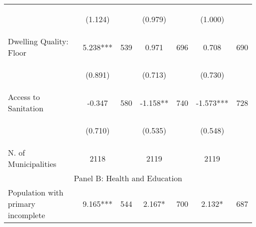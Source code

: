 \begin{tabular}{lcccccc}
\vspace{4pt} &  \begin{footnotesize}(1.124)\end{footnotesize}   & &
			    \begin{footnotesize}(0.979)\end{footnotesize}   & &
			    \begin{footnotesize}(1.000)\end{footnotesize}   &
			     \\          



Dwelling Quality: Floor   &  5.238***   &  539  &   0.971  &  696 &  0.708  &  690   \\

\vspace{4pt} &  \begin{footnotesize}(0.891)\end{footnotesize}   & &
			    \begin{footnotesize}(0.713)\end{footnotesize}   & &
			    \begin{footnotesize}(0.730)\end{footnotesize}   &
			     \\          

Access to Sanitation   &  -0.347   &  580  &   -1.158**  &  740 &  -1.573***  &  728   \\

\vspace{4pt} &  \begin{footnotesize}(0.710)\end{footnotesize}   & &
			    \begin{footnotesize}(0.535)\end{footnotesize}   & &
			    \begin{footnotesize}(0.548)\end{footnotesize}   &
			     \\          

N. of Municipalities  &   2118   &  &  2119    & &  2119  &    \\

\hline		
\multicolumn{7}{c}{Panel B: Health and Education}   \\                                                          


Population with primary incomplete   &  9.165***   &  544  &   2.167*  &  700 &  2.132*  &  687   \\



\end{tabular}
